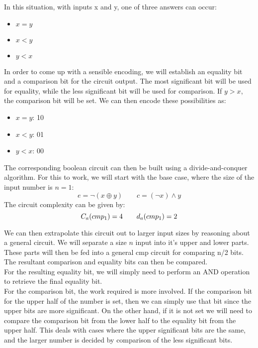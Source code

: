 \documentclass{exam} %
\theoremstyle{plain}
\theoremstyle{definition}
\theoremstyle{remark}
\numberwithin{equation}{section}  %
\begin{document}
\begin{questions}
  In this situation, with inputs x and y, one of three answers can occur:\\ 
  \begin{itemize}
    \item $x = y$\\
    \item $x < y$\\
    \item $y < x$\\
  \end{itemize}
  In order to come up with a sensible encoding, we will establish an equality 
  bit and a comparison bit for the circuit output. The most significant bit 
  will be used for equality, while the less significant bit will be used 
  for comparison. If $y > x$, the comparison bit will be set. We can then encode 
  these possibilities as:\\ 
  \begin{itemize}
    \item $x = y$: 10\\
    \item $x < y$: 01\\
    \item $y < x$: 00\\
  \end{itemize}
  The corresponding boolean circuit can then be built using a divide-and-conquer 
  algorithm. For this to work, we will start with the base case, where the size of
  the input number is $n = 1$:\\
  \[
    e = \neg (x \oplus y) \qquad
    c = (\neg x) \land y
  \]
  The circuit complexity can be given by:\\
  \[
    C_a(cmp_1) = 4 \qquad
    d_a(cmp_1) = 2\\
  \]

  We can then extrapolate this circuit out to larger input sizes by reasoning about
  a general circuit. We will separate a size $n$ input into it's upper and lower
  parts. These parts will then be fed into a general cmp circuit for comparing n/2 
  bits. The resultant comparison and equality bits can then be compared.\\
  
  For the resulting equality bit, we will simply need to perform an AND operation
  to retrieve the final equality bit.\\
  
  For the comparison bit, the work required is more involved. If the comparison bit
  for the upper half of the number is set, then we can simply use that bit since
  the upper bits are more significant. On the other hand, if it is not set we will
  need to compare the comparison bit from the lower half to the equality bit from
  the upper half. This deals with cases where the upper significant bits are the same,
  and the larger number is decided by comparison of the less significant bits.\\
  

\end{questions}
\end{document}
